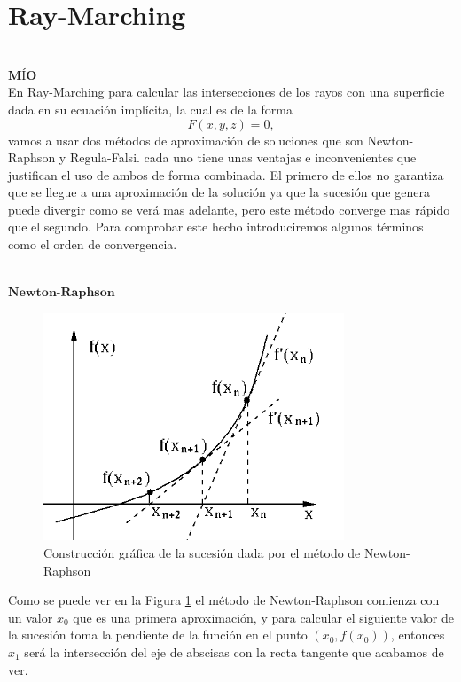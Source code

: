 \chapter*{Ray-Marching}

${ }$\\
$\textbf{MÍO}$
${ }$\\

En Ray-Marching para calcular las intersecciones de los rayos con una superficie dada en su ecuación implícita, la cual es de la forma
\[
	F(x,y,z) = 0,
\]
vamos a usar dos métodos de aproximación de soluciones que son Newton-Raphson y Regula-Falsi. cada uno tiene unas ventajas e inconvenientes que justifican el uso de ambos de forma combinada. El primero de ellos no garantiza que se llegue a una aproximación de la solución ya que la sucesión que genera puede divergir como se verá mas adelante, pero este método converge mas rápido que el segundo. Para comprobar este hecho introduciremos algunos términos como el orden de convergencia. 


${ }$\\
$\textbf{Newton-Raphson}$
${ }$\\

\begin{figure}
	\begin{center}
		\includegraphics[width=0.8\textwidth]{imagenes/newton.png}
	\end{center}
	\caption{Construcción gráfica de la sucesión dada por el método de Newton-Raphson}
	\label{fig:etiq_7}
\end{figure}

Como se puede ver en la Figura \ref{fig:etiq_7} el método de Newton-Raphson comienza con un valor $x_0$ que es una primera aproximación, y para calcular el siguiente valor de la sucesión toma la pendiente de la función en el punto $(x_0, f(x_0))$, entonces $x_1$ será la intersección del eje de abscisas con la recta tangente que acabamos de ver.
${ }$\\

